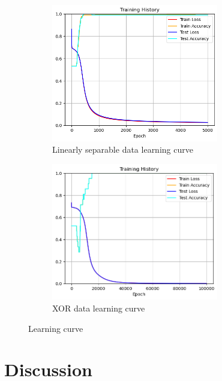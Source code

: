 \documentclass{homework}
\begin{document}
\begin{figure}[H]
    \centering
    \begin{subfigure}{0.45\textwidth}
        \centering
        \includegraphics[width=0.8\textwidth]{linear_curve.png}
        \caption{Linearly separable data learning curve}
    \end{subfigure}
    \begin{subfigure}{0.45\textwidth}
        \centering
        \includegraphics[width=0.8\textwidth]{xor_curve.png}
        \caption{XOR data learning curve}
    \end{subfigure}
    \caption{Learning curve}
\end{figure}

\section{Discussion}
\end{document}
